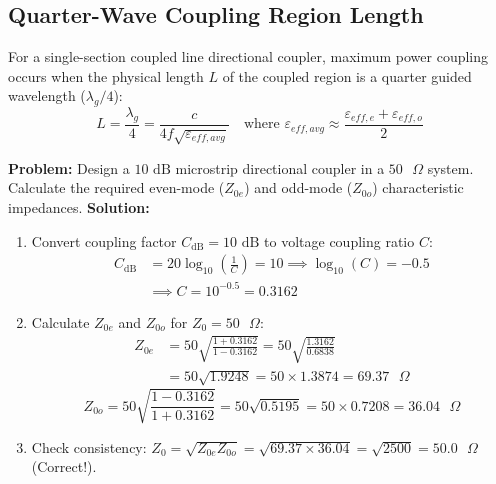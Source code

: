 \documentclass[12pt,a4paper]{article}
\begin{document}
\subsection{Quarter-Wave Coupling Region Length}
For a single-section coupled line directional coupler, maximum power coupling occurs when the physical length $L$ of the coupled region is a quarter guided wavelength ($\lambda_g/4$):
\begin{equation}
  L = \frac{\lambda_g}{4} = \frac{c}{4 f \sqrt{\varepsilon_{eff,avg}}} \quad \text{where } \varepsilon_{eff,avg} \approx \frac{\varepsilon_{eff,e} + \varepsilon_{eff,o}}{2}
\end{equation}

\begin{tcolorbox}[examplebox, title={Worked Numerical: $10\text{ dB}$ Coupled Line Design}]
  \textbf{Problem:} Design a $10\text{ dB}$ microstrip directional coupler in a $50\text{ }\Omega$ system. Calculate the required even-mode ($Z_{0e}$) and odd-mode ($Z_{0o}$) characteristic impedances.
  \tcblower
  \textbf{Solution:}
  \begin{enumerate}[label=Step \arabic*:, itemsep=4pt]
    \item Convert coupling factor $C_{\text{dB}} = 10\text{ dB}$ to voltage coupling ratio $C$:
      \begin{equation}
        \begin{aligned}
          C_{\text{dB}} &= 20 \log_{10}\left(\frac{1}{C}\right) = 10 \implies \log_{10}(C) = -0.5 \\
          &\implies C = 10^{-0.5} = 0.3162
        \end{aligned}
      \end{equation}
    \item Calculate $Z_{0e}$ and $Z_{0o}$ for $Z_0 = 50\text{ }\Omega$:
      \begin{equation}
        \begin{aligned}
          Z_{0e} &= 50 \sqrt{\frac{1 + 0.3162}{1 - 0.3162}} = 50 \sqrt{\frac{1.3162}{0.6838}} \\
          &= 50 \sqrt{1.9248} = 50 \times 1.3874 = 69.37\text{ }\Omega
        \end{aligned}
      \end{equation}
      \begin{equation}
        Z_{0o} = 50 \sqrt{\frac{1 - 0.3162}{1 + 0.3162}} = 50 \sqrt{0.5195} = 50 \times 0.7208 = 36.04\text{ }\Omega
      \end{equation}
    \item Check consistency: $Z_0 = \sqrt{Z_{0e} Z_{0o}} = \sqrt{69.37 \times 36.04} = \sqrt{2500} = 50.0\text{ }\Omega$ (Correct!).
  \end{enumerate}
\end{tcolorbox}
\end{document}
